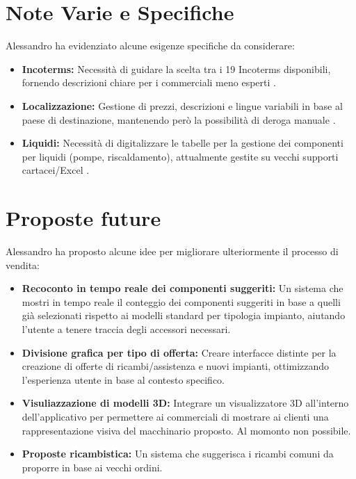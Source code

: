 \documentclass[12pt, a4paper]{article} %
\begin{document}
\section{Note Varie e Specifiche}
Alessandro ha evidenziato alcune esigenze specifiche da considerare:
\begin{itemize}
      \item \textbf{Incoterms:} Necessità di guidare la scelta tra i 19 Incoterms disponibili, fornendo descrizioni chiare per i commerciali meno esperti .
      \item \textbf{Localizzazione:} Gestione di prezzi, descrizioni e lingue variabili in base al paese di destinazione, mantenendo però la possibilità di deroga manuale .
      \item \textbf{Liquidi:} Necessità di digitalizzare le tabelle per la gestione dei componenti per liquidi (pompe, riscaldamento), attualmente gestite su vecchi supporti cartacei/Excel .
\end{itemize}

\section{Proposte future}
Alessandro ha proposto alcune idee per migliorare ulteriormente il processo
di vendita:
\begin{itemize}
      \item \textbf{Recoconto in tempo reale dei componenti suggeriti:} Un sistema che mostri in tempo reale il conteggio dei componenti
            suggeriti in base a quelli già selezionati rispetto ai modelli standard per tipologia impianto, aiutando l'utente a tenere traccia degli accessori necessari.
      \item \textbf{Divisione grafica per tipo di offerta:} Creare interfacce distinte per la creazione di offerte di ricambi/assistenza e nuovi impianti,
            ottimizzando l'esperienza utente in base al contesto specifico.
      \item \textbf{Visuliazzazione di modelli 3D:} Integrare un visualizzatore 3D all'interno dell'applicativo per permettere ai commerciali di
            mostrare ai clienti una rappresentazione visiva del macchinario proposto. Al momonto non possibile.
      \item \textbf{Proposte ricambistica:} Un sistema che suggerisca i ricambi comuni da proporre in base ai vecchi ordini.
\end{itemize}
\end{document}
